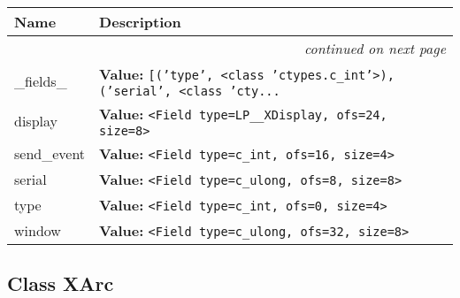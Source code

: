     \vspace{-1cm}
\hspace{\varindent}\begin{longtable}{|p{\varnamewidth}|p{\vardescrwidth}|l}
\cline{1-2}
\cline{1-2} \centering \textbf{Name} & \centering \textbf{Description}& \\
\cline{1-2}
\endhead\cline{1-2}\multicolumn{3}{r}{\small\textit{continued on next page}}\\\endfoot\cline{1-2}
\endlastfoot\raggedright \_\-f\-i\-e\-l\-d\-s\-\_\- & \raggedright \textbf{Value:} 
{\tt \texttt{[}\texttt{(}\texttt{'}\texttt{type}\texttt{'}\texttt{, }{\textless}class 'ctypes.c\_int'{\textgreater}\texttt{)}\texttt{, }\texttt{(}\texttt{'}\texttt{serial}\texttt{'}\texttt{, }{\textless}class 'cty\texttt{...}}&\\
\cline{1-2}
\raggedright d\-i\-s\-p\-l\-a\-y\- & \raggedright \textbf{Value:} 
{\tt {\textless}Field type=LP\_\_XDisplay, ofs=24, size=8{\textgreater}}&\\
\cline{1-2}
\raggedright s\-e\-n\-d\-\_\-e\-v\-e\-n\-t\- & \raggedright \textbf{Value:} 
{\tt {\textless}Field type=c\_int, ofs=16, size=4{\textgreater}}&\\
\cline{1-2}
\raggedright s\-e\-r\-i\-a\-l\- & \raggedright \textbf{Value:} 
{\tt {\textless}Field type=c\_ulong, ofs=8, size=8{\textgreater}}&\\
\cline{1-2}
\raggedright t\-y\-p\-e\- & \raggedright \textbf{Value:} 
{\tt {\textless}Field type=c\_int, ofs=0, size=4{\textgreater}}&\\
\cline{1-2}
\raggedright w\-i\-n\-d\-o\-w\- & \raggedright \textbf{Value:} 
{\tt {\textless}Field type=c\_ulong, ofs=32, size=8{\textgreater}}&\\
\cline{1-2}
\end{longtable}



\subsection{Class XArc}

